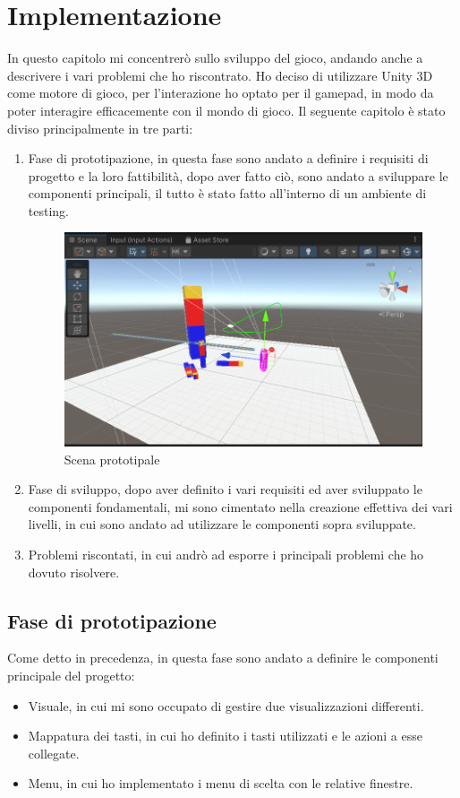 \documentclass[
a4paper,
cleardoublepage=empty,
headings=twolinechapter,
numbers=autoenddot,
]{scrbook}
\begin{document}
	\chapter{Implementazione}
	In questo capitolo mi concentrerò sullo sviluppo del gioco, andando anche a descrivere i vari problemi che ho riscontrato.
	Ho deciso di utilizzare Unity 3D come motore di gioco, per l'interazione ho optato per il gamepad, in modo da poter interagire efficacemente con il mondo di gioco.
	Il seguente capitolo è stato diviso principalmente in tre parti:
	\begin{enumerate}
		\item Fase di prototipazione, in questa fase sono andato a definire i requisiti di progetto e la loro fattibilità, dopo aver fatto ciò, sono andato a sviluppare le componenti principali, il tutto è stato fatto all'interno di un ambiente di testing.
		\begin{figure}[H]
			\centering
			\includegraphics[width=0.8\linewidth]{image/protot}
			\caption{Scena prototipale}
			\label{fig:protot}
		\end{figure}
		\item Fase di sviluppo, dopo aver definito i vari requisiti ed aver sviluppato le componenti fondamentali, mi sono cimentato nella creazione effettiva dei vari livelli, in cui sono andato ad utilizzare le componenti sopra sviluppate.
		\item Problemi riscontati, in cui andrò ad esporre i principali problemi che ho dovuto risolvere.
	\end{enumerate}
	\section{Fase di prototipazione}
	Come detto in precedenza, in questa fase sono andato a definire le componenti principale del progetto:
	\begin{itemize}
		\item Visuale, in cui mi sono occupato di gestire due visualizzazioni differenti.
		\item Mappatura dei tasti, in cui ho definito i tasti utilizzati e le azioni a esse collegate.
		\item Menu, in cui ho implementato i menu di scelta con le relative finestre.
	\end{itemize}
\end{document}
